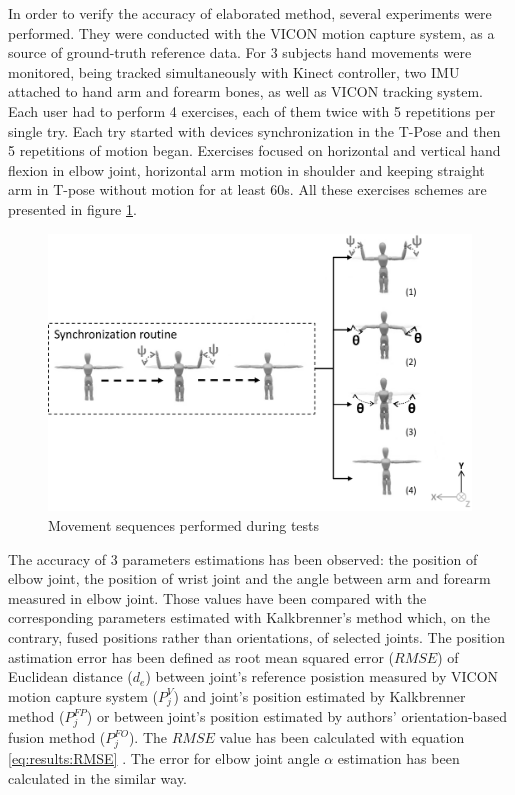 \documentclass[sensors,article,submit,moreauthors,pdftex,10pt,a4paper]{mdpi}
\begin{document}
In order to verify the accuracy of elaborated method, several experiments were performed. They were conducted with the VICON motion capture system, as a source of ground-truth reference data. For 3 subjects hand movements were monitored, being tracked simultaneously with Kinect controller, two IMU attached to hand arm and forearm bones, as well as VICON tracking system. Each user had to perform 4 exercises, each of them twice with 5 repetitions per single try. Each try started with devices synchronization in the T-Pose and then 5 repetitions of motion began. Exercises focused on horizontal and vertical hand flexion in elbow joint, horizontal arm motion in shoulder and keeping straight arm in T-pose without motion for at least 60s. All these exercises schemes are presented in figure \ref{fig:results:sequences}.

\begin{figure}[H]
	\centering
	\includegraphics[width=12cm]{Figure8.png}
	\caption{Movement sequences performed during tests}
	\label{fig:results:sequences}
\end{figure}

The accuracy of 3 parameters estimations has been observed: the position of elbow joint, the position of wrist joint and the angle between arm and forearm measured in elbow joint. Those values have been compared with the corresponding parameters estimated with Kalkbrenner’s method \cite{Kalkbrenner2014} which, on the contrary, fused positions rather than orientations, of selected joints. The position astimation error has been defined as root mean squared error ($RMSE$) of Euclidean distance ($d_e$) between joint’s reference posistion measured by VICON motion capture system ($P_j^V$) and joint’s position estimated by Kalkbrenner method ($P_j^{FP}$) or between joint’s position estimated by authors’ orientation-based fusion method ($P_j^{FO}$). The $RMSE$ value has been calculated with equation \ref{eq:results:RMSE} \cite{Armstrong1992}. The error for elbow joint angle $\alpha$ estimation has been calculated in the similar way.
\end{document}
